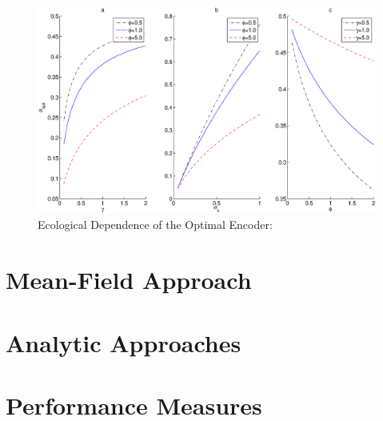 \begin{figure}
\label{fig:mmse_ou}
\includegraphics[width=\columnwidth]{figures/figure_5_4.eps}
\caption{Ecological Dependence of the Optimal Encoder:}
\end{figure}

\section{Mean-Field Approach}

\section{Analytic Approaches}

\section{Performance Measures}
